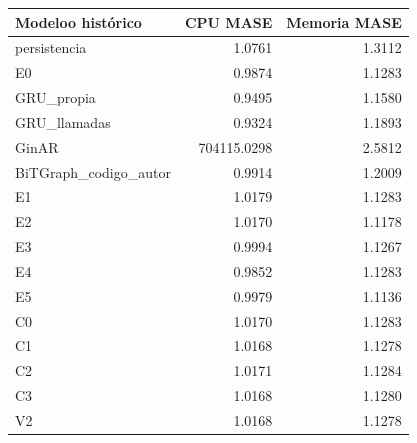 \begin{tabular}{lrr}
\toprule
Modeloo histórico & CPU MASE & Memoria MASE \\
\midrule
persistencia & 1.0761 & 1.3112 \\
E0 & 0.9874 & 1.1283 \\
GRU\_propia & 0.9495 & 1.1580 \\
GRU\_llamadas & 0.9324 & 1.1893 \\
GinAR & 704115.0298 & 2.5812 \\
BiTGraph\_codigo\_autor & 0.9914 & 1.2009 \\
E1 & 1.0179 & 1.1283 \\
E2 & 1.0170 & 1.1178 \\
E3 & 0.9994 & 1.1267 \\
E4 & 0.9852 & 1.1283 \\
E5 & 0.9979 & 1.1136 \\
C0 & 1.0170 & 1.1283 \\
C1 & 1.0168 & 1.1278 \\
C2 & 1.0171 & 1.1284 \\
C3 & 1.0168 & 1.1280 \\
V2 & 1.0168 & 1.1278 \\
\bottomrule
\end{tabular}
